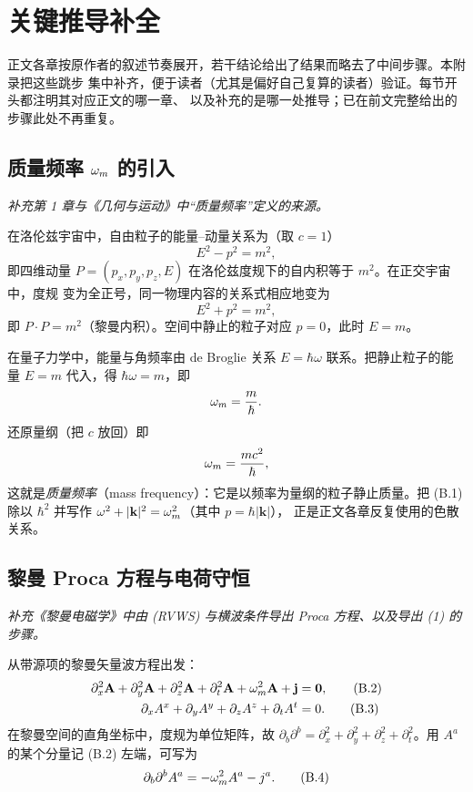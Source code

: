 \chapter{关键推导补全}

正文各章按原作者的叙述节奏展开，若干结论给出了结果而略去了中间步骤。本附录把这些跳步
集中补齐，便于读者（尤其是偏好自己复算的读者）验证。每节开头都注明其对应正文的哪一章、
以及补充的是哪一处推导；已在前文完整给出的步骤此处不再重复。

\section{质量频率 \texorpdfstring{$\omega_m$}{omega\_m} 的引入}
\emph{补充第 1 章与《几何与运动》中“质量频率”定义的来源。}

在洛伦兹宇宙中，自由粒子的能量--动量关系为（取 $c=1$）
\begin{equation}
E^{2}-p^{2}=m^{2},
\end{equation}
即四维动量 $P=(p_x,p_y,p_z,E)$ 在洛伦兹度规下的自内积等于 $m^{2}$。在正交宇宙中，度规
变为全正号，同一物理内容的关系式相应地变为
\begin{equation}
E^{2}+p^{2}=m^{2},
\tag{B.1}
\end{equation}
即 $P\cdot P=m^{2}$（黎曼内积）。空间中静止的粒子对应 $p=0$，此时 $E=m$。

在量子力学中，能量与角频率由 de Broglie 关系 $E=\hbar\omega$ 联系。把静止粒子的能量
$E=m$ 代入，得 $\hbar\omega=m$，即
\begin{equation}
\omega_m=\frac{m}{\hbar}.
\end{equation}
还原量纲（把 $c$ 放回）即
\begin{equation}
\omega_m=\frac{mc^{2}}{\hbar},
\end{equation}
这就是\emph{质量频率}（mass frequency）：它是以频率为量纲的粒子静止质量。把 (B.1) 除以
$\hbar^{2}$ 并写作 $\omega^{2}+|\mathbf{k}|^{2}=\omega_m^{2}$（其中 $p=\hbar|\mathbf{k}|$），
正是正文各章反复使用的色散关系。

\section{黎曼 Proca 方程与电荷守恒}
\emph{补充《黎曼电磁学》中由 (RVWS) 与横波条件导出 Proca 方程、以及导出 (1) 的步骤。}

从带源项的黎曼矢量波方程出发：
\begin{align}
\partial_{x}^{2}\mathbf{A}+\partial_{y}^{2}\mathbf{A}+\partial_{z}^{2}\mathbf{A}+\partial_{t}^{2}\mathbf{A}+\omega_m^{2}\mathbf{A}+\mathbf{j}&=\mathbf{0}, \tag{B.2}\\
\partial_{x}A^{x}+\partial_{y}A^{y}+\partial_{z}A^{z}+\partial_{t}A^{t}&=0. \tag{B.3}
\end{align}
在黎曼空间的直角坐标中，度规为单位矩阵，故 $\partial_{b}\partial^{b}=\partial_{x}^{2}+\partial_{y}^{2}
+\partial_{z}^{2}+\partial_{t}^{2}$。用 $A^{a}$ 的某个分量记 (B.2) 左端，可写为
\begin{equation}
\partial_{b}\partial^{b}A^{a}=-\omega_m^{2}A^{a}-j^{a}.
\tag{B.4}
\end{equation}

